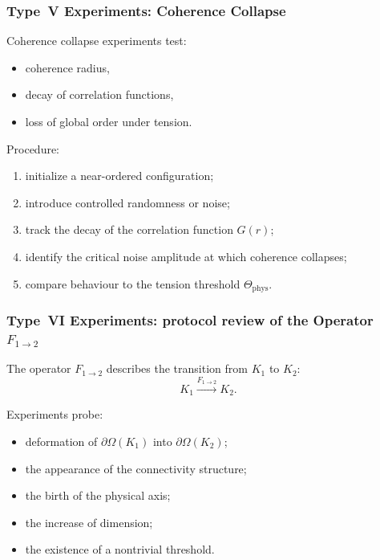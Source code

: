 \subsubsection{Type~V Experiments: Coherence Collapse}

Coherence collapse experiments test:

\begin{itemize}
    \item coherence radius,
    \item decay of correlation functions,
    \item loss of global order under tension.
\end{itemize}

Procedure:

\begin{enumerate}
    \item initialize a near-ordered configuration;
    \item introduce controlled randomness or noise;
    \item track the decay of the correlation function $G(r)$;
    \item identify the critical noise amplitude at which coherence
          collapses;
    \item compare behaviour to the tension threshold $\Theta_{\mathrm{phys}}$.
\end{enumerate}



\subsubsection{Type~VI Experiments: protocol review of the Operator $F_{1\rightarrow 2}$}

The operator $F_{1\rightarrow 2}$ describes the transition from $K_1$ to $K_2$:
\[
   K_1 \xrightarrow{F_{1\rightarrow 2}} K_2.
\]

Experiments probe:

\begin{itemize}
    \item deformation of $\partial\Omega(K_1)$ into
          $\partial\Omega(K_2)$;
    \item the appearance of the connectivity structure;
    \item the birth of the physical axis;
    \item the increase of dimension;
    \item the existence of a nontrivial threshold.
\end{itemize}

